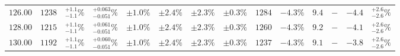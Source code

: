 \begin{landscape}
\begin{table}[ht!]
{\begin{tabular}{| cc | ccc | ccc | ccc | cc | c |}
$126.00$ & $1238$ & $^{+1.1}_{-1.1}\%$ & {\color{black!55}$^{+0.063}_{-0.051}\%$} & {\color{black!55}$\pm 1.0\%$} & $\pm 2.4\%$ & {\color{black!55}$\pm 2.3\%$} & {\color{black!55}$\pm 0.3\%$} & $1284$ & $-4.3\%$ & $9.4$ & $-$ & $-4.4$ & $^{+2.6}_{-2.6}\%$ \\
$128.00$ & $1215$ & $^{+1.1}_{-1.1}\%$ & {\color{black!55}$^{+0.061}_{-0.051}\%$} & {\color{black!55}$\pm 1.0\%$} & $\pm 2.4\%$ & {\color{black!55}$\pm 2.3\%$} & {\color{black!55}$\pm 0.3\%$} & $1260$ & $-4.3\%$ & $9.2$ & $-$ & $-4.1$ & $^{+2.6}_{-2.6}\%$ \\
$130.00$ & $1192$ & $^{+1.1}_{-1.1}\%$ & {\color{black!55}$^{+0.060}_{-0.051}\%$} & {\color{black!55}$\pm 1.0\%$} & $\pm 2.4\%$ & {\color{black!55}$\pm 2.3\%$} & {\color{black!55}$\pm 0.3\%$} & $1237$ & $-4.3\%$ & $9.1$ & $-$ & $-3.8$ & $^{+2.6}_{-2.6}\%$ \\
\cline{1-14}
\end{tabular}
}
\end{table}


\end{landscape}
